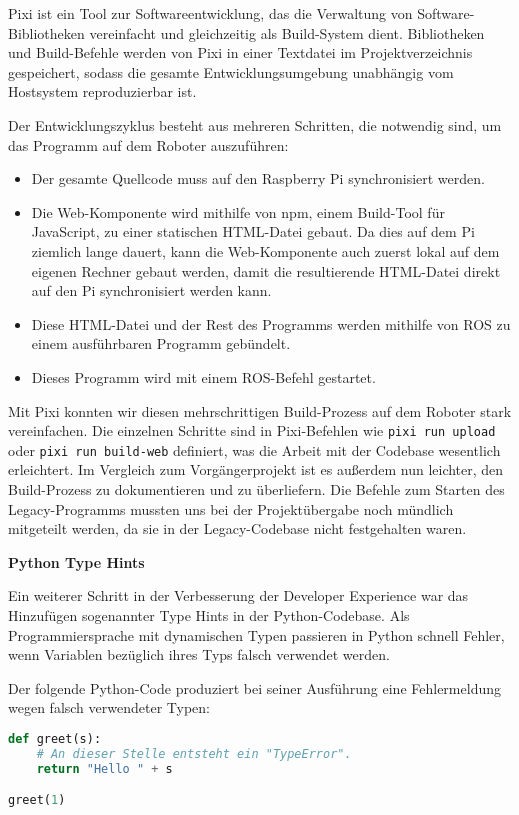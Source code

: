 Pixi ist ein Tool zur Softwareentwicklung, das die Verwaltung von Software-Bibliotheken vereinfacht und gleichzeitig als Build-System dient. Bibliotheken und Build-Befehle werden von Pixi in einer Textdatei im Projektverzeichnis gespeichert, sodass die gesamte Entwicklungsumgebung unabhängig vom Hostsystem reproduzierbar ist.

Der Entwicklungszyklus besteht aus mehreren Schritten, die notwendig sind, um das Programm auf dem Roboter auszuführen:
\begin{itemize}
	\item Der gesamte Quellcode muss auf den Raspberry Pi synchronisiert werden.
	\item Die Web-Komponente wird mithilfe von npm, einem Build-Tool für JavaScript, zu einer statischen HTML-Datei gebaut. Da dies auf dem Pi ziemlich lange dauert, kann die Web-Komponente auch zuerst lokal auf dem eigenen Rechner gebaut werden, damit die resultierende HTML-Datei direkt auf den Pi synchronisiert werden kann.
	\item Diese HTML-Datei und der Rest des Programms werden mithilfe von ROS zu einem ausführbaren Programm gebündelt.
	\item Dieses Programm wird mit einem ROS-Befehl gestartet.
\end{itemize}

Mit Pixi konnten wir diesen mehrschrittigen Build-Prozess auf dem Roboter stark vereinfachen. Die einzelnen Schritte sind in Pixi-Befehlen wie \texttt{pixi run upload} oder \texttt{pixi run build-web} definiert, was die Arbeit mit der Codebase wesentlich erleichtert. Im Vergleich zum Vorgängerprojekt ist es außerdem nun leichter, den Build-Prozess zu dokumentieren und zu überliefern. Die Befehle zum Starten des Legacy-Programms mussten uns bei der Projektübergabe noch mündlich mitgeteilt werden, da sie in der Legacy-Codebase nicht festgehalten waren. 

\textbf{Python Type Hints}

Ein weiterer Schritt in der Verbesserung der Developer Experience war das Hinzufügen sogenannter Type Hints in der Python-Codebase. Als Programmiersprache mit dynamischen Typen passieren in Python schnell Fehler, wenn Variablen bezüglich ihres Typs falsch verwendet werden.

Der folgende Python-Code produziert bei seiner Ausführung eine Fehlermeldung wegen falsch verwendeter Typen:

\begin{lstlisting}[language=Python]
def greet(s):
	# An dieser Stelle entsteht ein "TypeError".
	return "Hello " + s

greet(1)
\end{lstlisting}

